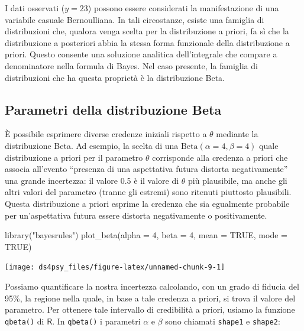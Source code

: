 \documentclass[
  11pt,
]{krantz}
\makeatletter
\newenvironment{Shaded}{\begin{snugshade}}{\end{snugshade}}
\newcommand{\AttributeTok}[1]{\textcolor[rgb]{0.61,0.61,0.61}{#1}}
\newcommand{\ConstantTok}[1]{\textcolor[rgb]{0,0,0}{#1}}
\newcommand{\DecValTok}[1]{\textcolor[rgb]{0.06,0.06,0.06}{#1}}
\newcommand{\FunctionTok}[1]{\textcolor[rgb]{0,0,0}{#1}}
\newcommand{\NormalTok}[1]{#1}
\newcommand{\StringTok}[1]{\textcolor[rgb]{0.5,0.5,0.5}{#1}}
\newenvironment{kframe}{%
\medskip{}
\setlength{\fboxsep}{.8em}
 \def\at@end@of@kframe{}%
 \ifinner\ifhmode%
  \def\at@end@of@kframe{\end{minipage}}%
  \begin{minipage}{\columnwidth}%
 \fi\fi%
 \def\FrameCommand##1{\hskip\@totalleftmargin \hskip-\fboxsep
 \colorbox{shadecolor}{##1}\hskip-\fboxsep
     \hskip-\linewidth \hskip-\@totalleftmargin \hskip\columnwidth}%
 \MakeFramed {\advance\hsize-\width
   \@totalleftmargin\z@ \linewidth\hsize
   \@setminipage}}%
 {\par\unskip\endMakeFramed%
 \at@end@of@kframe}
\renewenvironment{Shaded}{\begin{kframe}}{\end{kframe}}
\newcommand{\R}{\textsf{R}} %
\theoremstyle{definition}
\theoremstyle{definition}
\theoremstyle{definition}
\theoremstyle{definition}
\theoremstyle{remark}
\makeatother
\begin{document}
I dati osservati (\(y = 23\)) possono essere considerati la manifestazione di una variabile casuale Bernoulliana. In tali circostanze, esiste una famiglia di distribuzioni che, qualora venga scelta per la distribuzione a priori, fa sì che la distribuzione a posteriori abbia la stessa forma funzionale della distribuzione a priori. Questo consente una soluzione analitica dell'integrale che compare a denominatore nella formula di Bayes. Nel caso presente, la famiglia di distribuzioni che ha questa proprietà è la distribuzione Beta.

\hypertarget{parametri-della-distribuzione-beta}{%
\subsection{Parametri della distribuzione Beta}\label{parametri-della-distribuzione-beta}}

È possibile esprimere diverse credenze iniziali rispetto a \(\theta\) mediante la distribuzione Beta. Ad esempio, la scelta di una \(\mbox{Beta}(\alpha = 4, \beta = 4)\) quale distribuzione a priori per il parametro \(\theta\) corrisponde alla credenza a priori che associa all'evento ``presenza di una aspettativa futura distorta negativamente'' una grande incertezza: il valore 0.5 è il valore di \(\theta\) più plausibile, ma anche gli altri valori del parametro (tranne gli estremi) sono ritenuti piuttosto plausibili. Questa distribuzione a priori esprime la credenza che sia egualmente probabile per un'aspettativa futura essere distorta negativamente o positivamente.

\begin{Shaded}
\begin{Highlighting}[]
\FunctionTok{library}\NormalTok{(}\StringTok{"bayesrules"}\NormalTok{)}
\FunctionTok{plot\_beta}\NormalTok{(}\AttributeTok{alpha =} \DecValTok{4}\NormalTok{, }\AttributeTok{beta =} \DecValTok{4}\NormalTok{, }\AttributeTok{mean =} \ConstantTok{TRUE}\NormalTok{, }\AttributeTok{mode =} \ConstantTok{TRUE}\NormalTok{)}
\end{Highlighting}
\end{Shaded}

\begin{center}\texttt{[image: ds4psy\_files/figure-latex/unnamed-chunk-9-1]} \end{center}

Possiamo quantificare la nostra incertezza calcolando, con un grado di fiducia del 95\%, la regione nella quale, in base a tale credenza a priori, si trova il valore del parametro. Per ottenere tale intervallo di credibilità a priori, usiamo la funzione \texttt{qbeta()} di \(\R\). In \texttt{qbeta()} i parametri \(\alpha\) e \(\beta\) sono chiamati \texttt{shape1} e \texttt{shape2}:
\end{document}
